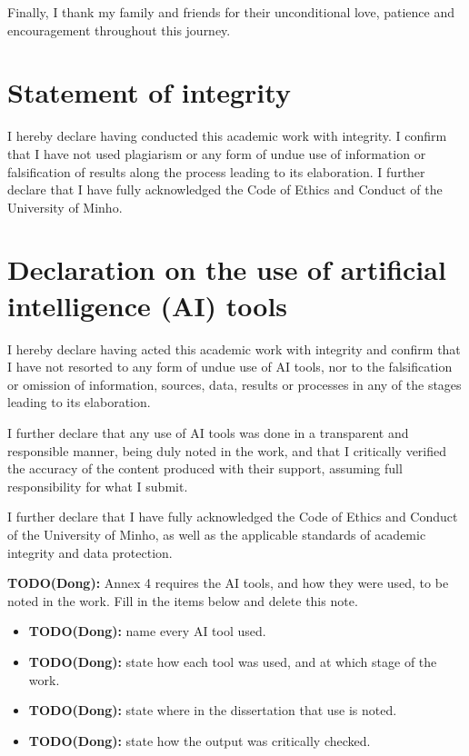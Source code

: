 Finally, I thank my family and friends for their unconditional love, patience and encouragement throughout this journey.

\clearpage
{}
\section*{Statement of integrity}

I hereby declare having conducted this academic work with integrity.
I confirm that I have not used plagiarism or any form of undue use of information or falsification of results along the process leading to its elaboration.
I further declare that I have fully acknowledged the Code of Ethics and Conduct of the University of Minho.

\section*{Declaration on the use of artificial intelligence (AI) tools}

I hereby declare having acted this academic work with integrity and confirm that I have not resorted to any form of undue use of AI tools, nor to the falsification or omission of information, sources, data, results or processes in any of the stages leading to its elaboration.

I further declare that any use of AI tools was done in a transparent and responsible manner, being duly noted in the work, and that I critically verified the accuracy of the content produced with their support, assuming full responsibility for what I submit.

I further declare that I have fully acknowledged the Code of Ethics and Conduct of the University of Minho, as well as the applicable standards of academic integrity and data protection.

\noindent\textbf{TODO(Dong):} Annex 4 requires the AI tools, and how they were used, to be noted in the work. Fill in the items below and delete this note.
\begin{itemize}
  \item \textbf{TODO(Dong):} name every AI tool used.
  \item \textbf{TODO(Dong):} state how each tool was used, and at which stage of the work.
  \item \textbf{TODO(Dong):} state where in the dissertation that use is noted.
  \item \textbf{TODO(Dong):} state how the output was critically checked.
\end{itemize}

